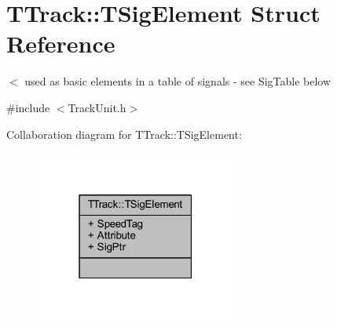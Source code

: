 \hypertarget{struct_t_track_1_1_t_sig_element}{}\section{T\+Track\+:\+:T\+Sig\+Element Struct Reference}
\label{struct_t_track_1_1_t_sig_element}


$<$ used as basic elements in a table of signals -\/ see Sig\+Table below  




{\ttfamily \#include $<$Track\+Unit.\+h$>$}



Collaboration diagram for T\+Track\+:\+:T\+Sig\+Element\+:\nopagebreak
\begin{figure}[H]
\begin{center}
\leavevmode
\includegraphics[width=187pt]{struct_t_track_1_1_t_sig_element__coll__graph}
\end{center}
\end{figure}
